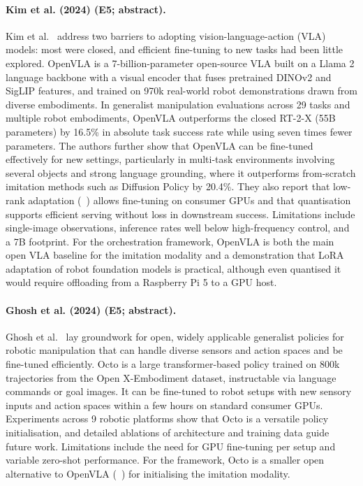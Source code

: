 \documentclass[10pt,a4paper]{article}
\begin{document}
\paragraph{Kim et al. (2024) (E5; abstract).} Kim et al.~\cite{Kim2024} address two barriers to adopting vision-language-action (VLA) models: most were closed, and efficient fine-tuning to new tasks had been little explored. OpenVLA is a 7-billion-parameter open-source VLA built on a Llama 2 language backbone with a visual encoder that fuses pretrained DINOv2 and SigLIP features, and trained on 970k real-world robot demonstrations drawn from diverse embodiments. In generalist manipulation evaluations across 29 tasks and multiple robot embodiments, OpenVLA outperforms the closed RT-2-X (55B parameters) by 16.5\% in absolute task success rate while using seven times fewer parameters. The authors further show that OpenVLA can be fine-tuned effectively for new settings, particularly in multi-task environments involving several objects and strong language grounding, where it outperforms from-scratch imitation methods such as Diffusion Policy by 20.4\%. They also report that low-rank adaptation (~\cite{Hu2022}) allows fine-tuning on consumer GPUs and that quantisation supports efficient serving without loss in downstream success. Limitations include single-image observations, inference rates well below high-frequency control, and a 7B footprint. For the orchestration framework, OpenVLA is both the main open VLA baseline for the imitation modality and a demonstration that LoRA adaptation of robot foundation models is practical, although even quantised it would require offloading from a Raspberry Pi 5 to a GPU host.

\paragraph{Ghosh et al. (2024) (E5; abstract).} Ghosh et al.~\cite{Octo2024} lay groundwork for open, widely applicable generalist policies for robotic manipulation that can handle diverse sensors and action spaces and be fine-tuned efficiently. Octo is a large transformer-based policy trained on 800k trajectories from the Open X-Embodiment dataset, instructable via language commands or goal images. It can be fine-tuned to robot setups with new sensory inputs and action spaces within a few hours on standard consumer GPUs. Experiments across 9 robotic platforms show that Octo is a versatile policy initialisation, and detailed ablations of architecture and training data guide future work. Limitations include the need for GPU fine-tuning per setup and variable zero-shot performance. For the framework, Octo is a smaller open alternative to OpenVLA (~\cite{Kim2024}) for initialising the imitation modality.
\end{document}
